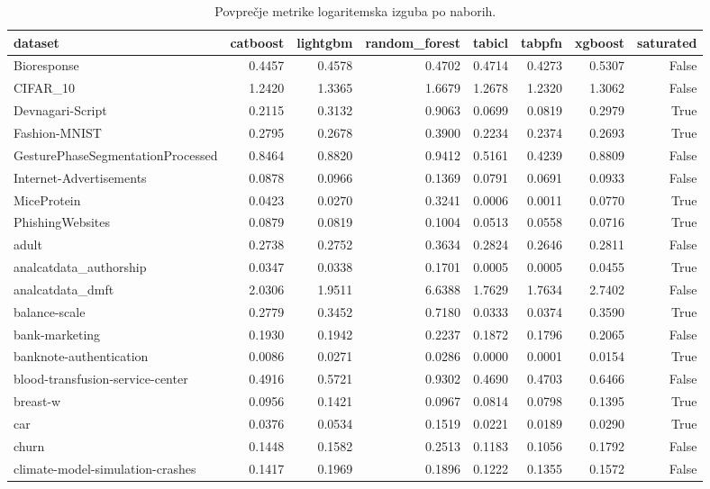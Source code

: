 \begin{table}[htbp]
\centering
\caption{Povprečje metrike logaritemska izguba po naborih.}
\label{tab:pivot}
\begin{tabular}{lrrrrrrr}
\hline
dataset & catboost & lightgbm & random\_forest & tabicl & tabpfn & xgboost & saturated \\
\hline
Bioresponse & 0.4457 & 0.4578 & 0.4702 & 0.4714 & 0.4273 & 0.5307 & False \\
CIFAR\_10 & 1.2420 & 1.3365 & 1.6679 & 1.2678 & 1.2320 & 1.3062 & False \\
Devnagari-Script & 0.2115 & 0.3132 & 0.9063 & 0.0699 & 0.0819 & 0.2979 & True \\
Fashion-MNIST & 0.2795 & 0.2678 & 0.3900 & 0.2234 & 0.2374 & 0.2693 & True \\
GesturePhaseSegmentationProcessed & 0.8464 & 0.8820 & 0.9412 & 0.5161 & 0.4239 & 0.8809 & False \\
Internet-Advertisements & 0.0878 & 0.0966 & 0.1369 & 0.0791 & 0.0691 & 0.0933 & False \\
MiceProtein & 0.0423 & 0.0270 & 0.3241 & 0.0006 & 0.0011 & 0.0770 & True \\
PhishingWebsites & 0.0879 & 0.0819 & 0.1004 & 0.0513 & 0.0558 & 0.0716 & True \\
adult & 0.2738 & 0.2752 & 0.3634 & 0.2824 & 0.2646 & 0.2811 & False \\
analcatdata\_authorship & 0.0347 & 0.0338 & 0.1701 & 0.0005 & 0.0005 & 0.0455 & True \\
analcatdata\_dmft & 2.0306 & 1.9511 & 6.6388 & 1.7629 & 1.7634 & 2.7402 & False \\
balance-scale & 0.2779 & 0.3452 & 0.7180 & 0.0333 & 0.0374 & 0.3590 & True \\
bank-marketing & 0.1930 & 0.1942 & 0.2237 & 0.1872 & 0.1796 & 0.2065 & False \\
banknote-authentication & 0.0086 & 0.0271 & 0.0286 & 0.0000 & 0.0001 & 0.0154 & True \\
blood-transfusion-service-center & 0.4916 & 0.5721 & 0.9302 & 0.4690 & 0.4703 & 0.6466 & False \\
breast-w & 0.0956 & 0.1421 & 0.0967 & 0.0814 & 0.0798 & 0.1395 & True \\
car & 0.0376 & 0.0534 & 0.1519 & 0.0221 & 0.0189 & 0.0290 & True \\
churn & 0.1448 & 0.1582 & 0.2513 & 0.1183 & 0.1056 & 0.1792 & False \\
climate-model-simulation-crashes & 0.1417 & 0.1969 & 0.1896 & 0.1222 & 0.1355 & 0.1572 & False \\

\end{tabular}
\end{table}

